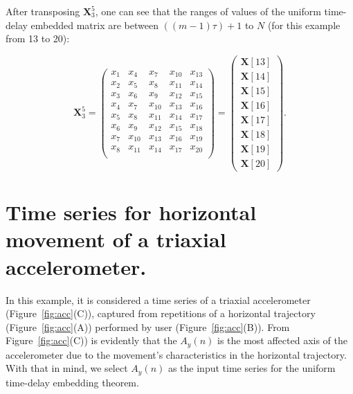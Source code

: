 After transposing $\boldsymbol{X}^{5}_{3}$, one can see that the ranges of
values of the uniform time-delay embedded matrix are between
$ ( (m-1)\tau )+1$  to $N$  (for this example from 13 to 20):

\begin{equation}\label{eq:etdee2}
\boldsymbol{X}^5_3 =
\begin{pmatrix}
x_1 & x_4 & x_{7} & x_{10} & x_{13} \\
x_2 & x_5 & x_{8} & x_{11} & x_{14} \\
x_3 & x_6 & x_{9} & x_{12} & x_{15} \\
x_4 & x_7 & x_{10} & x_{13} & x_{16} \\
x_5 & x_8 & x_{11} & x_{14} & x_{17} \\
x_6 & x_9 & x_{12} & x_{15} & x_{18} \\
x_7 & x_{10} & x_{13} & x_{16} & x_{19} \\
x_8 & x_{11} & x_{14} & x_{17} & x_{20} \\
\end{pmatrix} =
\begin{pmatrix}
   \boldsymbol{X}[13] \\
   \boldsymbol{X}[14] \\
   \boldsymbol{X}[15] \\
   \boldsymbol{X}[16] \\
   \boldsymbol{X}[17] \\
   \boldsymbol{X}[18] \\
   \boldsymbol{X}[19] \\
   \boldsymbol{X}[20]
\end{pmatrix}.
\end{equation}


\section{Time series for horizontal movement of a triaxial accelerometer.}
In this example, it is considered a time series of a triaxial accelerometer 
(Figure~\ref{fig:acc}(C)),
captured from repetitions of a horizontal trajectory (Figure~\ref{fig:acc}(A))
performed by user (Figure~\ref{fig:acc}(B)).
From Figure~\ref{fig:acc}(C)) is evidently that the $A_y(n)$ is 
the most affected axis of the accelerometer due to the movement's 
characteristics in the horizontal trajectory.
With that in mind, we select $A_y(n)$ as the input time series
for the uniform time-delay embedding theorem.

